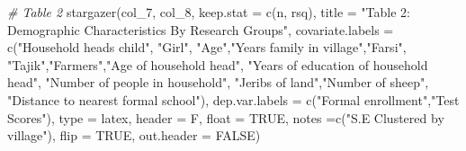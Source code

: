 \documentclass[
]{article}
\newenvironment{Shaded}{\begin{snugshade}}{\end{snugshade}}
\newcommand{\AttributeTok}[1]{\textcolor[rgb]{0.77,0.63,0.00}{#1}}
\newcommand{\CommentTok}[1]{\textcolor[rgb]{0.56,0.35,0.01}{\textit{#1}}}
\newcommand{\ConstantTok}[1]{\textcolor[rgb]{0.00,0.00,0.00}{#1}}
\newcommand{\FunctionTok}[1]{\textcolor[rgb]{0.00,0.00,0.00}{#1}}
\newcommand{\NormalTok}[1]{#1}
\newcommand{\StringTok}[1]{\textcolor[rgb]{0.31,0.60,0.02}{#1}}
\begin{document}
\begin{Shaded}
\begin{Highlighting}[]
\CommentTok{\# Table 2}
\FunctionTok{stargazer}\NormalTok{(col\_7, col\_8, }
          \AttributeTok{keep.stat =} \FunctionTok{c}\NormalTok{(}\StringTok{\textquotesingle{}n\textquotesingle{}}\NormalTok{, }\StringTok{\textquotesingle{}rsq\textquotesingle{}}\NormalTok{), }
          \AttributeTok{title =} \StringTok{"Table 2: Demographic Characteristics By Research Groups"}\NormalTok{,}
          \AttributeTok{covariate.labels =} \FunctionTok{c}\NormalTok{(}\StringTok{"Household head\textquotesingle{}s child"}\NormalTok{, }\StringTok{"Girl"}\NormalTok{, }
                               \StringTok{"Age"}\NormalTok{,}\StringTok{"Years family in village"}\NormalTok{,}\StringTok{"Farsi"}\NormalTok{,}
                               \StringTok{"Tajik"}\NormalTok{,}\StringTok{"Farmers"}\NormalTok{,}\StringTok{"Age of household head"}\NormalTok{,}
                               \StringTok{"Years of education of household head"}\NormalTok{, }\StringTok{"Number of people in household"}\NormalTok{,}
                               \StringTok{"Jeribs of land"}\NormalTok{,}\StringTok{"Number of sheep"}\NormalTok{, }
                               \StringTok{"Distance to nearest formal school"}\NormalTok{),}
          \AttributeTok{dep.var.labels =} \FunctionTok{c}\NormalTok{(}\StringTok{"Formal enrollment"}\NormalTok{,}\StringTok{"Test Scores"}\NormalTok{), }
          \AttributeTok{type =} \StringTok{\textquotesingle{}latex\textquotesingle{}}\NormalTok{, }\AttributeTok{header =}\NormalTok{ F, }\AttributeTok{float =} \ConstantTok{TRUE}\NormalTok{,  }
          \AttributeTok{notes =}\FunctionTok{c}\NormalTok{(}\StringTok{"S.E Clustered by village"}\NormalTok{), }\AttributeTok{flip =} \ConstantTok{TRUE}\NormalTok{, }\AttributeTok{out.header =} \ConstantTok{FALSE}\NormalTok{)}
\end{Highlighting}
\end{Shaded}
\end{document}
